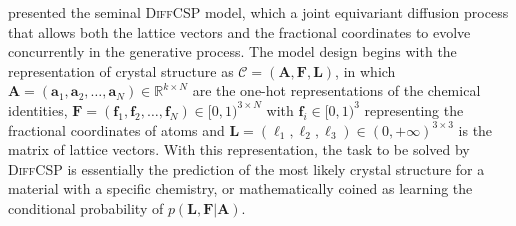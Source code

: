 \citet{jiao2023crystal} presented the seminal \textsc{DiffCSP} model, which a joint equivariant diffusion process that allows both the lattice vectors and the fractional coordinates to evolve concurrently in the generative process. The model design begins with the representation of crystal structure as $\mathcal{C}=(\bm{A},\bm{F},\bm{L})$, in which $\bm{A}=(\bm{a}_1,\bm{a}_2,\ldots,\bm{a}_N)\in\mathbb{R}^{k\times N}$ are the one-hot representations of the chemical identities, $\bm{F}=(\bm{f}_1,\bm{f}_2,\ldots,\bm{f}_N)\in [0,1)^{3\times N}$ with $\bm{f}_i\in[0,1)^3$ representing the fractional coordinates of atoms and $\bm{L}=(\boldsymbol{\ell}_1,\boldsymbol{\ell}_2,\boldsymbol{\ell}_3)\in(0,+\infty)^{3\times 3}$  is the matrix of lattice vectors. With this representation, the task to be solved by \textsc{DiffCSP} is essentially the prediction of the most likely crystal structure for a material with a specific chemistry, or mathematically coined as learning the conditional probability of $p(\bm{L},\bm{F}|\bm{A})$. 

